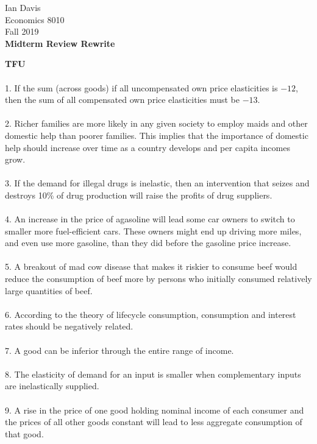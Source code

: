 \documentclass[11pt]{article}
\begin{document}
\begin{flushleft}
Ian Davis\\
Economics 8010\\
Fall 2019\\
\bigskip
\textbf{Midterm Review Rewrite}\\
\end{flushleft}
\textbf{TFU}\\
\\
1. If the sum (across goods) if all uncompensated own price elasticities is $-12$, then the sum of all compensated own price elasticities must be $-13$.\\
\\
2. Richer families are more likely in any given society to employ maids and other domestic help than poorer families. This implies that the importance of domestic help should increase over time as a country develops and per capita incomes grow.\\
\\
3. If the demand for illegal drugs is inelastic, then an intervention that seizes and destroys 10\% of drug production will raise the profits of drug suppliers.\\
\\
4. An increase in the price of agasoline will lead some car owners to switch to smaller more fuel-efficient cars. These owners might end up driving more miles, and even use more gasoline, than they did before the gasoline price increase.\\
\\
5. A breakout of mad cow disease that makes it riskier to consume beef would reduce the consumption of beef more by persons who initially consumed relatively large quantities of beef.\\
\\
6. According to the theory of lifecycle consumption, consumption and interest rates should be negatively related.\\
\\
7. A good can be inferior through the entire range of income.\\
\\
8. The elasticity of demand for an input is smaller when complementary inputs are inelastically supplied.\\
\\
9. A rise in the price of one good holding nominal income of each consumer and the prices of all other goods constant will lead to less aggregate consumption of that good.
\end{document}

